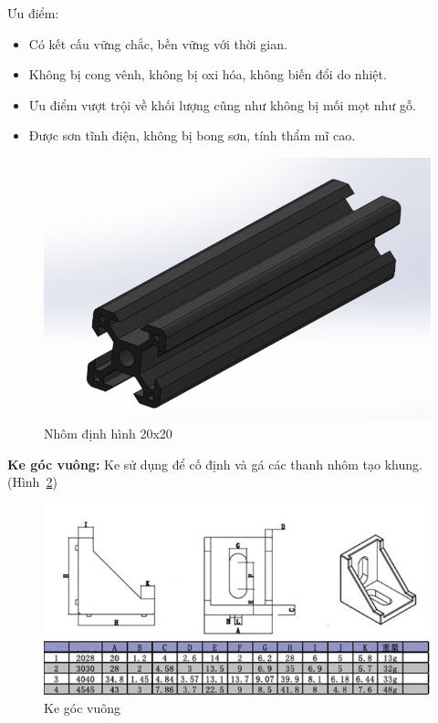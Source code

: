 Ưu điểm:
\begin{itemize}
\item Có kết cấu vững chắc, bền vững với thời gian.
\item Không bị cong vênh, không bị oxi hóa, không biến đổi do nhiệt.
\item Ưu điểm vượt trội về khối lượng cũng như không bị mối mọt như gỗ.
\item Được sơn tĩnh điện, không bị bong sơn, tính thẩm mĩ cao.
\end{itemize}
\begin{center}
    \begin{figure}[htp]
    \begin{center}
     \includegraphics[scale=1]{Chapters/Chapter3/Images/Nhomdinhhinh}
    \end{center}
    \caption{Nhôm định hình 20x20}
    \label{fig:nhomdinhhinh}
    \end{figure}
\end{center}

\textbf{Ke góc vuông:} Ke sử dụng để cố định và gá các thanh nhôm tạo khung. (Hình~\ref{fig:kegocvuong})
\begin{center}
    \begin{figure}[htp]
    \begin{center}
     \includegraphics[scale=1]{Chapters/Chapter3/Images/Kegocvuong}
    \end{center}
    \caption{Ke góc vuông}
    \label{fig:kegocvuong}
    \end{figure}
\end{center}

